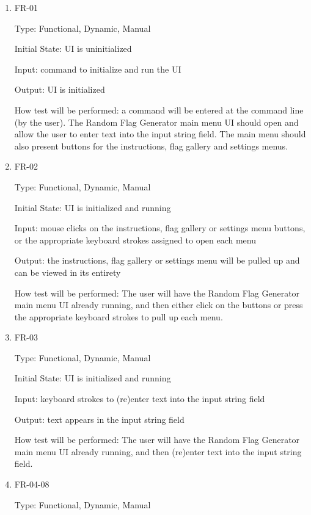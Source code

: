 \documentclass[12pt, titlepage]{article}
\begin{document}
\begin{enumerate}

\item{FR-01\\}

Type: Functional, Dynamic, Manual

Initial State: UI is uninitialized

Input: command to initialize and run the UI

Output: UI is initialized

How test will be performed: a command will be entered at the command line (by
the user). The Random Flag Generator main menu UI should open and allow the
user to enter text into the input string field. The main menu should also
present buttons for the instructions, flag gallery and settings menus.
					
\item{FR-02\\}

Type: Functional, Dynamic, Manual

Initial State: UI is initialized and running

Input: mouse clicks on the instructions, flag gallery or settings menu
buttons, or the appropriate keyboard strokes assigned to open each menu

Output: the instructions, flag gallery or settings menu will be pulled up and
can be viewed in its entirety

How test will be performed: The user will have the Random Flag Generator main
menu UI already running, and then either click on the buttons or press the
appropriate keyboard strokes to pull up each menu.

\item{FR-03\\}

Type: Functional, Dynamic, Manual

Initial State: UI is initialized and running

Input: keyboard strokes to (re)enter text into the input string field

Output: text appears in the input string field

How test will be performed: The user will have the Random Flag Generator main
menu UI already running, and then (re)enter text into the input string field.

\item{FR-04-08\\}

Type: Functional, Dynamic, Manual


\end{enumerate}
\end{document}
